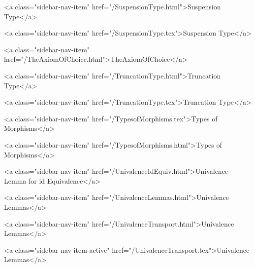       
    
      
        
          <a class="sidebar-nav-item" href="/SuspensionType.html">Suspension Type</a>
        
      
    
      
        
          <a class="sidebar-nav-item" href="/SuspensionType.tex">Suspension Type</a>
        
      
    
      
        
          <a class="sidebar-nav-item" href="/TheAxiomOfChoice.html">TheAxiomOfChoice</a>
        
      
    
      
        
          <a class="sidebar-nav-item" href="/TruncationType.html">Truncation Type</a>
        
      
    
      
        
          <a class="sidebar-nav-item" href="/TruncationType.tex">Truncation Type</a>
        
      
    
      
        
          <a class="sidebar-nav-item" href="/TypesofMorphisms.tex">Types of Morphisms</a>
        
      
    
      
        
          <a class="sidebar-nav-item" href="/TypesofMorphisms.html">Types of Morphisms</a>
        
      
    
      
        
          <a class="sidebar-nav-item" href="/UnivalenceIdEquiv.html">Univalence Lemma for id Equivalence</a>
        
      
    
      
        
          <a class="sidebar-nav-item" href="/UnivalenceLemmas.html">Univalence Lemmas</a>
        
      
    
      
        
          <a class="sidebar-nav-item" href="/UnivalenceTransport.html">Univalence Lemmas</a>
        
      
    
      
        
          <a class="sidebar-nav-item active" href="/UnivalenceTransport.tex">Univalence Lemmas</a>
        
